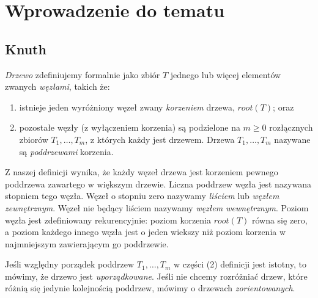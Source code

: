 \chapter{Wprowadzenie do tematu}



\section{Knuth}

\emph{Drzewo} zdefiniujemy formalnie jako zbiór $T$ jednego lub więcej elementów zwanych \emph{węzłami}, takich że:

\begin{enumerate}
 \item istnieje jeden wyróżniony węzeł zwany \emph{korzeniem} drzewa, $root(T)$; oraz
 \item pozostałe węzły (z wyłączeniem korzenia) są podzielone na $m \geq 0$ rozłącznych zbiorów $T_{1},\ldots, T_{m}$,
	z których każdy jest drzewem. Drzewa $T_{1},\ldots, T_{m}$ nazywane są \emph{poddrzewami} korzenia.
\end{enumerate}

Z naszej definicji wynika, że każdy węzeł drzewa jest korzeniem pewnego poddrzewa zawartego w większym drzewie.
Liczna poddrzew węzła jest nazywana stopniem tego węzła.
Węzeł o stopniu zero nazywamy \emph{liściem} lub \emph{węzłem zewnętrznym}. 
Węzeł nie będący liściem nazywamy \emph{węzłem wewnętrznym}. 
Poziom węzła jest zdefiniowany rekurencyjnie: poziom korzenia $root(T)$ równa się zero,
a poziom każdego innego węzła jest o jeden wiekszy niż poziom korzenia w najmniejszym 
 zawierającym go poddrzewie.




Jeśli względny porządek poddrzew $T_{1},\ldots, T_{m}$ w części (2) definicji jest istotny,
to mówimy, że drzewo jest \emph{uporządkowane}. 
Jeśli nie chcemy rozróżniać drzew, które różnią się jedynie kolejnością poddrzew, mówimy o drzewach \emph{zorientowanych}.

